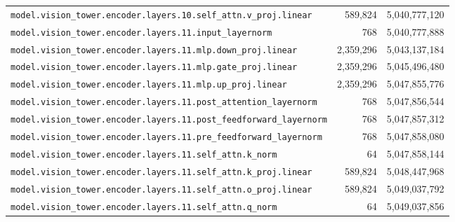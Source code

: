 \documentclass[10pt,a4paper]{article}
\theoremstyle{definition}
\begin{document}
\begin{appendices}
\begin{longtable}{p{9.5cm}rr}
\texttt{model.\allowbreak{}vision\_tower.\allowbreak{}encoder.\allowbreak{}layers.\allowbreak{}10.\allowbreak{}self\_attn.\allowbreak{}v\_proj.\allowbreak{}linear} & 589,824 & 5,040,777,120 \\
\texttt{model.\allowbreak{}vision\_tower.\allowbreak{}encoder.\allowbreak{}layers.\allowbreak{}11.\allowbreak{}input\_layernorm} & 768 & 5,040,777,888 \\
\texttt{model.\allowbreak{}vision\_tower.\allowbreak{}encoder.\allowbreak{}layers.\allowbreak{}11.\allowbreak{}mlp.\allowbreak{}down\_proj.\allowbreak{}linear} & 2,359,296 & 5,043,137,184 \\
\texttt{model.\allowbreak{}vision\_tower.\allowbreak{}encoder.\allowbreak{}layers.\allowbreak{}11.\allowbreak{}mlp.\allowbreak{}gate\_proj.\allowbreak{}linear} & 2,359,296 & 5,045,496,480 \\
\texttt{model.\allowbreak{}vision\_tower.\allowbreak{}encoder.\allowbreak{}layers.\allowbreak{}11.\allowbreak{}mlp.\allowbreak{}up\_proj.\allowbreak{}linear} & 2,359,296 & 5,047,855,776 \\
\texttt{model.\allowbreak{}vision\_tower.\allowbreak{}encoder.\allowbreak{}layers.\allowbreak{}11.\allowbreak{}post\_attention\_layernorm} & 768 & 5,047,856,544 \\
\texttt{model.\allowbreak{}vision\_tower.\allowbreak{}encoder.\allowbreak{}layers.\allowbreak{}11.\allowbreak{}post\_feedforward\_layernorm} & 768 & 5,047,857,312 \\
\texttt{model.\allowbreak{}vision\_tower.\allowbreak{}encoder.\allowbreak{}layers.\allowbreak{}11.\allowbreak{}pre\_feedforward\_layernorm} & 768 & 5,047,858,080 \\
\texttt{model.\allowbreak{}vision\_tower.\allowbreak{}encoder.\allowbreak{}layers.\allowbreak{}11.\allowbreak{}self\_attn.\allowbreak{}k\_norm} & 64 & 5,047,858,144 \\
\texttt{model.\allowbreak{}vision\_tower.\allowbreak{}encoder.\allowbreak{}layers.\allowbreak{}11.\allowbreak{}self\_attn.\allowbreak{}k\_proj.\allowbreak{}linear} & 589,824 & 5,048,447,968 \\
\texttt{model.\allowbreak{}vision\_tower.\allowbreak{}encoder.\allowbreak{}layers.\allowbreak{}11.\allowbreak{}self\_attn.\allowbreak{}o\_proj.\allowbreak{}linear} & 589,824 & 5,049,037,792 \\
\texttt{model.\allowbreak{}vision\_tower.\allowbreak{}encoder.\allowbreak{}layers.\allowbreak{}11.\allowbreak{}self\_attn.\allowbreak{}q\_norm} & 64 & 5,049,037,856 \\

\end{longtable}
\end{appendices}
\end{document}
